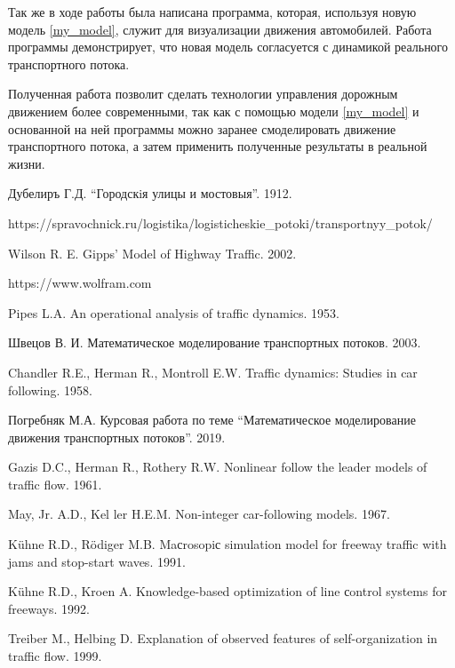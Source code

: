 \documentclass[12pt, a4paper]{extarticle}
\numberwithin{equation}{section}
\numberwithin{figure}{section}
\begin{document}
Так же в ходе работы была написана программа, которая, используя новую модель \eqref{my_model}, служит для визуализации движения автомобилей. Работа программы демонстрирует, что новая модель согласуется с динамикой реального транспортного потока.

Полученная работа позволит сделать технологии управления дорожным движением более современными, так как с помощью модели \eqref{my_model} и основанной на ней программы можно заранее смоделировать движение транспортного потока, а затем применить полученные результаты в реальной жизни.
\newpage

\begin{thebibliography}{**}
	Дубелиръ Г.Д. ``Городскiя улицы и мостовыя''. 1912.
	
	https://spravochnick.ru/logistika/logisticheskie\_potoki/transportnyy\_potok/
	
	Wilson R. E. Gipps’ Model of Highway Traffic. 2002.
	
	https://www.wolfram.com
	
	Pipes L.A. An operational analysis of traffic dynamics. 1953. 
	
	Швецов В. И. Математическое моделирование транспортных потоков. 2003. 
	
	Chandler R.E., Herman R., Montroll E.W. Traffic dynamics: Studies in car following. 1958.
	
	Погребняк М.А. Курсовая работа по теме ``Математическое моделирование движения транспортных потоков''. 2019.
	
	Gazis D.C., Herman R., Rothery R.W. Nonlinear follow the leader models of traffic flow. 1961.
	
	May, Jr. A.D., Kel ler H.E.M. Non-integer car-following models. 1967.
	
	K\"{u}hne R.D., R\"{o}diger M.B. Maсrosopiс simulation model for freeway traffic with jams
	and stop-start waves. 1991.
	
	K\"{u}hne R.D., Kroen A. Knowledge-based optimization of line сontrol systems for freeways. 1992.

	Treiber M., Helbing D. Explanation of observed features of self-organization in traffic flow.
	1999.
	

\end{thebibliography}
\end{document}
